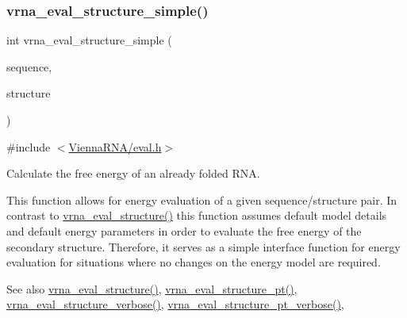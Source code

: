 \subsubsection{\texorpdfstring{vrna\+\_\+eval\+\_\+structure\+\_\+simple()}{vrna\_eval\_structure\_simple()}}
{\footnotesize\ttfamily int vrna\+\_\+eval\+\_\+structure\+\_\+simple (\begin{DoxyParamCaption}\item[{const char $\ast$}]{sequence,  }\item[{const char $\ast$}]{structure }\end{DoxyParamCaption})}



{\ttfamily \#include $<$\mbox{\hyperlink{eval_8h}{Vienna\+R\+N\+A/eval.\+h}}$>$}



Calculate the free energy of an already folded R\+NA. 

This function allows for energy evaluation of a given sequence/structure pair. In contrast to \mbox{\hyperlink{group__eval_ga58f199f1438d794a265f3b27fc8ea631}{vrna\+\_\+eval\+\_\+structure()}} this function assumes default model details and default energy parameters in order to evaluate the free energy of the secondary structure. Therefore, it serves as a simple interface function for energy evaluation for situations where no changes on the energy model are required.

\begin{DoxySeeAlso}{See also}
\mbox{\hyperlink{group__eval_ga58f199f1438d794a265f3b27fc8ea631}{vrna\+\_\+eval\+\_\+structure()}}, \mbox{\hyperlink{group__eval_gadbd09372ddfd7a450bbd590c96a6bfe4}{vrna\+\_\+eval\+\_\+structure\+\_\+pt()}}, \mbox{\hyperlink{group__eval_ga0928d699d310178f84ee2351034e5cb5}{vrna\+\_\+eval\+\_\+structure\+\_\+verbose()}}, \mbox{\hyperlink{group__eval_ga8a517cfeeae8c376ae7b1e0c401d38b4}{vrna\+\_\+eval\+\_\+structure\+\_\+pt\+\_\+verbose()}},
\end{DoxySeeAlso}

